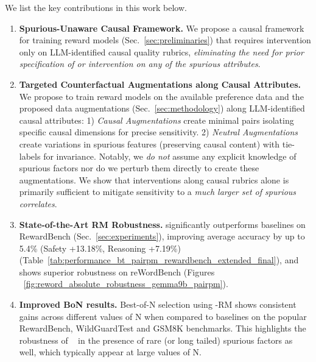\vspace{0.05in}
We list the key contributions in this work below.

\begin{enumerate}[itemsep=0pt,left=2pt]
    \item \textbf{Spurious-Unaware Causal Framework.}
    We propose a causal framework for training reward models (Sec.~\ref{sec:preliminaries}) that requires intervention only on LLM-identified causal quality rubrics, \textit{eliminating the need for prior specification of or intervention on any of the spurious attributes}.
    \item \textbf{Targeted Counterfactual Augmentations along Causal Attributes.}
    We propose to train reward models on the available preference data and the proposed data augmentations (Sec.~\ref{sec:methodology}) along LLM-identified causal attributes: 1) \textit{Causal Augmentations} create minimal pairs isolating specific causal dimensions for precise sensitivity. 2) \textit{Neutral Augmentations} create variations in spurious features (preserving causal content) with tie-labels for invariance.  Notably, we \textit{do not} assume any explicit knowledge of spurious factors nor do we perturb them directly to create these augmentations. We show that interventions along causal rubrics alone is primarily sufficient to mitigate sensitivity to a \textit{much larger set of spurious correlates}.
     \item \textbf{State-of-the-Art RM Robustness.}
    \carma{} significantly outperforms baselines on RewardBench (Sec.~\ref{sec:experiments}), improving average accuracy by up to 5.4\% (Safety +13.18\%, Reasoning +7.19\%) (Table~\ref{tab:performance_bt_pairpm_rewardbench_extended_final}), and shows superior robustness on reWordBench (Figures ~\ref{fig:reword_absolute_robustness_gemma9b_pairpm}).
    \item \textbf{Improved BoN results.} 
    Best-of-N selection using \carma-RM shows consistent gains across different values of N when compared to baselines on the popular RewardBench, WildGuardTest and GSM8K benchmarks. This highlights the robustness of \carma~ in the presence of rare (or long tailed) spurious factors as well, which typically appear at large values of N.
\end{enumerate}